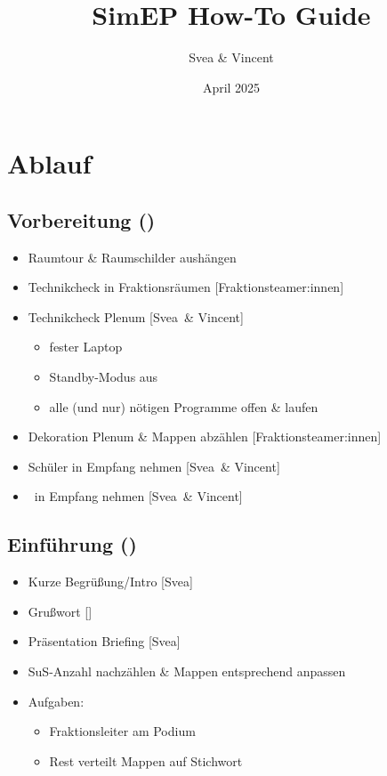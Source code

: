 \documentclass{article}
\title{SimEP How-To Guide}
\author{Svea \& Vincent}
\date{April 2025}
\newcommand{\KOM}{Svea}
\newcommand{\EP}{Vincent}
\begin{document}
	\section{Ablauf}
	\subsection{Vorbereitung (\timeVorb)}
	\begin{itemize}
		\item Raumtour \& Raumschilder aushängen
        \item Technikcheck in Fraktionsräumen [Fraktionsteamer:innen]
		\item Technikcheck Plenum [\KOM\ \& \EP]
		\begin{itemize}
			\item fester Laptop
			\item Standby-Modus aus
			\item alle (und nur) nötigen Programme offen \& laufen
		\end{itemize}
		\item Dekoration Plenum \& Mappen abzählen [Fraktionsteamer:innen]
		\item Schüler in Empfang nehmen [\KOM\ \& \EP]
		\item \politiker\ in Empfang nehmen [\KOM\ \& \EP]		
	\end{itemize}
	
	\subsection{Einführung (\timeEinf)}
	\begin{itemize}
		\item Kurze Begrüßung/Intro [\KOM]
		\item Grußwort [\politiker]
		\item Präsentation Briefing [\KOM]
        \item SuS-Anzahl nachzählen \& Mappen entsprechend anpassen
        \item Aufgaben:
        \begin{itemize}
            \item Fraktionsleiter am Podium
            \item Rest verteilt Mappen auf Stichwort
        \end{itemize}
    \end{itemize}
	
\end{document}
